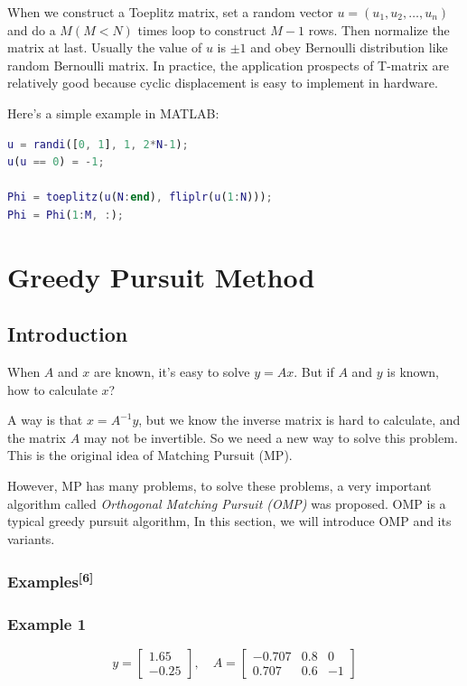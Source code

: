\documentclass[10pt,a4paper,oneside,numbers=noenddot]{scrbook}
\theoremstyle{ctplain}
\theoremstyle{ctresult}
\begin{document}
When we construct a Toeplitz matrix, set a random vector $u = (u_1, u_2, \ldots, u_n)$ and
do a $M (M < N)$ times loop to construct $M-1$ rows. Then normalize the matrix at last.
Usually the value of $u$ is $\pm 1$ and obey Bernoulli distribution like random Bernoulli
matrix. In practice, the application prospects of T-matrix are relatively good because
cyclic displacement is easy to implement in hardware.

Here's a simple example in MATLAB:

\begin{lstlisting}[language=Matlab]
%% Toeplitz Matrix Example
u = randi([0, 1], 1, 2*N-1);
u(u == 0) = -1;

Phi = toeplitz(u(N:end), fliplr(u(1:N)));
Phi = Phi(1:M, :);
\end{lstlisting}

\section{Greedy Pursuit Method}

\subsection{Introduction}

When $A$ and $x$ are known, it's easy to solve $y = Ax$. But if $A$ and $y$ is known,
how to calculate $x$?

A way is that $x = A^{-1}y$, but we know the inverse matrix is hard to calculate,
and the matrix $A$ may not be invertible. So we need a new way to solve this problem.
This is the original idea of Matching Pursuit (MP).

However, MP has many problems, to solve these problems, a very important algorithm
called \emph{Orthogonal Matching Pursuit (OMP)} was proposed. OMP is a typical greedy
pursuit algorithm, In this section, we will introduce OMP and its variants.

\subsubsection{Examples\textsuperscript{[6]}}

\subsubsection{Example 1}
\[
  y = \begin{bmatrix} 1.65 \\ -0.25 \end{bmatrix}, \quad
  A = \begin{bmatrix} -0.707 & 0.8 & 0 \\ 0.707 & 0.6 & -1 \end{bmatrix}
\]
\end{document}

